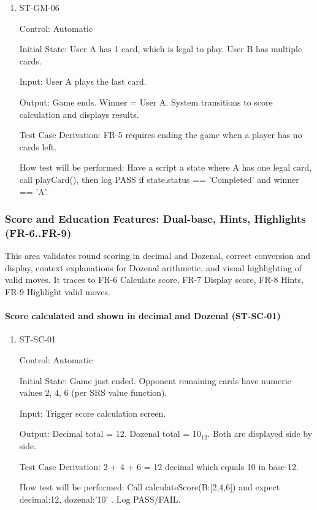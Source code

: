 \documentclass[12pt, titlepage]{article}
\begin{document}
\begin{enumerate}
\item{ST-GM-06\\}

Control: Automatic
					
Initial State: User A has 1 card, which is legal to play. User B has multiple cards.
					
Input: User A plays the last card.
					
Output: Game ends. Winner = User A. System transitions to score calculation and displays results.

Test Case Derivation: FR-5 requires ending the game when a player has no cards left.

How test will be performed: Have a script a state where A has one legal card, call playCard(), then log PASS if state.status == 'Completed' and winner == 'A'.
\end{enumerate}

\subsubsection{Score and Education Features: Dual-base, Hints, Highlights (FR-6..FR-9)}

This area validates round scoring in decimal and Dozenal, correct conversion and display, context explanations for Dozenal arithmetic, and visual highlighting of valid moves. It traces to FR-6 Calculate score, FR-7 Display score, FR-8 Hints, FR-9 Highlight valid moves.

\paragraph{Score calculated and shown in decimal and Dozenal (ST-SC-01)}

\begin{enumerate}
\item{ST-SC-01\\}

Control: Automatic
					
Initial State: Game just ended. Opponent remaining cards have numeric values 2, 4, 6 (per SRS value function).
					
Input: Trigger score calculation screen.
					
Output: Decimal total = 12. Dozenal total = 10$_{12}$. Both are displayed side by side.

Test Case Derivation: 2 + 4 + 6 = 12 decimal which equals 10 in base-12.

How test will be performed: Call calculateScore({B:[2,4,6]}) and expect { decimal:12, dozenal:'10' }. Log PASS/FAIL.
\end{enumerate}
\end{document}
